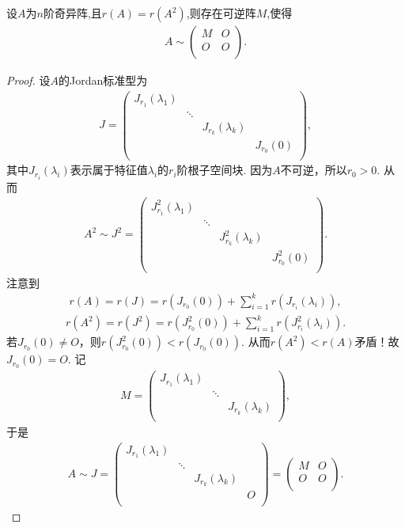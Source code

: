 \documentclass[../../main.tex]{subfiles}%
\begin{document}
\begin{proposition}\label{proposition:矩阵开方的秩等于其秩则幂零Jordan块均为1阶}
设$A$为$n$阶奇异阵,且$r(A)=r(A^2)$,则存在可逆阵$M$,使得
\begin{align*}
A\sim \left( \begin{matrix}
M&		O\\
O&		O\\
\end{matrix} \right) .
\end{align*}
\end{proposition}
\begin{proof}
设$A$的Jordan标准型为
\begin{align*}
J=\begin{pmatrix}
J_{r_1}(\lambda_1)&		&		&		\\
&		\ddots&		&		\\
&		&		J_{r_k}(\lambda_k)&		\\
&		&		&		J_{r_0}(0)\\
\end{pmatrix},
\end{align*}
其中$J_{r_i}(\lambda_i)$表示属于特征值$\lambda_i$的$r_i$阶根子空间块. 因为$A$不可逆，所以$r_0>0$. 从而
\begin{align*}
A^2\sim J^2=\begin{pmatrix}
J_{r_1}^{2}(\lambda_1)&		&		&		\\
&		\ddots&		&		\\
&		&		J_{r_k}^{2}(\lambda_k)&		\\
&		&		&		J_{r_0}^{2}(0)\\
\end{pmatrix}.
\end{align*}
注意到
\begin{align*}
r(A)=r(J)=r(J_{r_0}(0))+\sum\limits_{i=1}^k r(J_{r_i}(\lambda_i)),
\end{align*}
\begin{align*}
r(A^2)=r(J^2)=r(J_{r_0}^{2}(0))+\sum\limits_{i=1}^k r(J_{r_i}^{2}(\lambda_i)).
\end{align*}
若$J_{r_0}(0)\ne O$，则$r(J_{r_0}^{2}(0))<r(J_{r_0}(0))$. 从而$r(A^2)<r(A)$矛盾！故$J_{r_0}(0)=O$. 记
\begin{align*}
M=\begin{pmatrix}
J_{r_1}(\lambda_1)&		&		\\
&		\ddots&		\\
&		&		J_{r_k}(\lambda_k)\\
\end{pmatrix},
\end{align*}
于是
\begin{align*}
A\sim J=\begin{pmatrix}
J_{r_1}(\lambda_1)&		&		&		\\
&		\ddots&		&		\\
&		&		J_{r_k}(\lambda_k)&		\\
&		&		&		O\\
\end{pmatrix}=\begin{pmatrix}
M&		O\\
O&		O\\
\end{pmatrix}.
\end{align*}
\end{proof}
\end{document}
